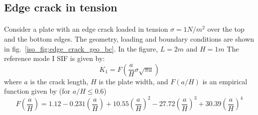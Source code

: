 \subsection{Edge crack in tension}

\paragraph{}
Consider a plate with an edge crack loaded in tension $\sigma=1N/m^2$ over the top and the bottom edges.
The geometry, loading and boundary conditions are shown in fig.~\ref{iso_fig:edge_crack_geo_bc}.
In the figure, $L=2m$ and $H=1m$
The reference mode \RN{1} SIF is given by:
    \begin{equation}
        K_1 = F\left(
            \frac{a}{H}
            \sigma \sqrt{\pi a}
        \label{iso_eq:edge_crack_k1}
        \right)
    \end{equation}
where $a$ is the crack length, $H$ is the plate width, and $F(a/H)$ is an empirical function given by (for $a/H \leq 0.6$)
    \begin{equation}
        F\left( \frac{a}{H} \right) =
            1.12 - 0.231 \left( \frac{a}{H} \right) +
            10.55\left( \frac{a}{H} \right)^2 -
            27.72\left( \frac{a}{H} \right)^3 +
            30.39\left( \frac{a}{H} \right)^4
    \end{equation}

